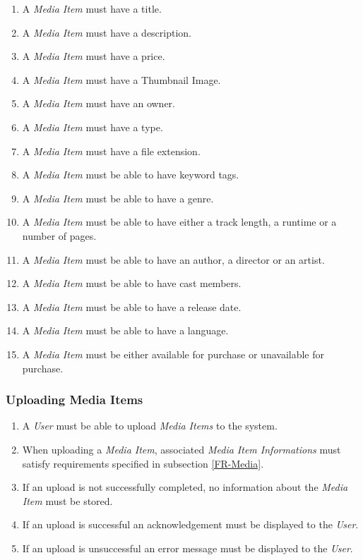 \documentclass[../report.tex]{subfiles}
\begin{document}
\begin{enumerate}[label=\textbf{FR-\twodigits*}, resume]
	\item A \textit{Media Item} must have a title.
	\item A \textit{Media Item} must have a description.
	\item A \textit{Media Item} must have a price.
	\item A \textit{Media Item} must have a Thumbnail Image.
	\item A \textit{Media Item} must have an owner.
	\item A \textit{Media Item} must have a type.
	\item A \textit{Media Item} must have a file extension.
	\item A \textit{Media Item} must be able to have keyword tags.
	\item A \textit{Media Item} must be able to have a genre.
	\item A \textit{Media Item} must be able to have either a track length, a runtime or a number of pages.
	\item A \textit{Media Item} must be able to have an author, a director or an artist.
	\item A \textit{Media Item} must be able to have cast members.
	\item A \textit{Media Item} must be able to have a release date.
	\item A \textit{Media Item} must be able to have a language.
	
	\item A \textit{Media Item} must be either available for purchase or unavailable for purchase.
\end{enumerate}

\subsubsection {Uploading Media Items}

\begin{enumerate}[label=\textbf{FR-\twodigits*}, resume]
	\item A \textit{User} must be able to upload \textit{Media Items} to the system.
	\item When uploading a \textit{Media Item}, associated \textit{Media Item Informations} must satisfy requirements specified in subsection \ref{FR-Media}.
	\item If an upload is not successfully completed, no information about the \textit{Media Item} must be stored.
	\item If an upload is successful an acknowledgement must be displayed to the \textit{User}.
	\item If an upload is unsuccessful an error message must be displayed to the \textit{User}. 
\end{enumerate}
\end{document}

